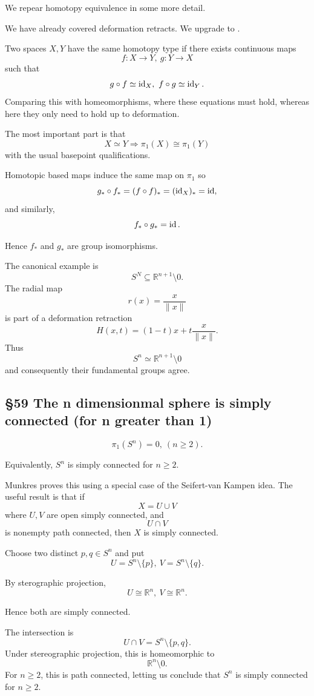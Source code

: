 \documentclass[11pt]{article}
\begin{document}
We repear homotopy equivalence in some more detail. 

We have already covered deformation retracts. 
We upgrade to . 

Two spaces $X,Y$ have the same homotopy 
type if there exists continuous maps 
\[
    f : X \to Y, \ g : Y \to X 
\]
such that 
\[
    g \circ f \simeq \operatorname{id}_X, \ f\circ g \simeq \operatorname{id}_Y. 
\]
Comparing this with homeomorphisms, where 
these equations must hold, whereas here 
they only need to hold up to deformation. 

The most important part is that 
\[
    X \simeq Y \Rightarrow \pi_1(X) \cong \pi_1(Y)
\]
with the usual basepoint qualifications. 

Homotopic based maps induce the same map on $\pi_1$ so 
\[
    g_* \circ f_* = (f \circ f)_* = (\operatorname{id}_X)_* 
    = \operatorname{id}, 
\]
and similarly, 
\[
    f_* \circ g_* = \operatorname{id}. 
\]

Hence $f_*$ and $g_*$ are group isomorphisms. 

The canonical example is 
\[
    S^N \subseteq \mathbb R^{n+1} \setminus 0. 
\]
The radial map 
\[
    r(x) = \frac{x}{\|x\|}
\]
is part of a deformation retraction 
\[
    H(x,t) = (1-t)x + t \frac{x}{\|x\|}. 
\]
Thus 
\[
    S^n \simeq \mathbb R^{n+1} \setminus 0
\]
and consequently their fundamental groups agree. 

\subsection{\S59 The n dimensionmal sphere is simply connected (for n greater than 1)}
\begin{thm}
    \[
        \pi_1(S^n) = 0, \ (n \geq 2). 
    \]
\end{thm}
Equivalently, $S^n$ is simply connected for $n \geq 2$. 

Munkres proves this using a special case 
of the Seifert-van Kampen idea. The useful result is 
that if 
\[
    X = U \cup V 
\]
where $U,V$ are open simply connected, and 
\[
    U \cap V 
\]
is nonempty path connected, then $X$ is simply connected. 

Choose two distinct $p,q \in S^n$ and put 
\[
    U = S^n \setminus \{p\}, \ V = S^n \setminus \{q\}. 
\]

By sterographic projection, 
\[
    U \cong \mathbb R^n, \ V \cong \mathbb R^n. 
\]

Hence both are simply connected. 

The intersection is 
\[
    U \cap V = S^n \setminus \{p,q\}. 
\]
Under stereographic projection, this is homeomorphic to 
\[
    \mathbb R^n \setminus 0. 
\]
For $n \geq 2$, this is path connected, letting 
us conclude that $S^n$ is simply connected for $n \geq 2$.
\end{document}
